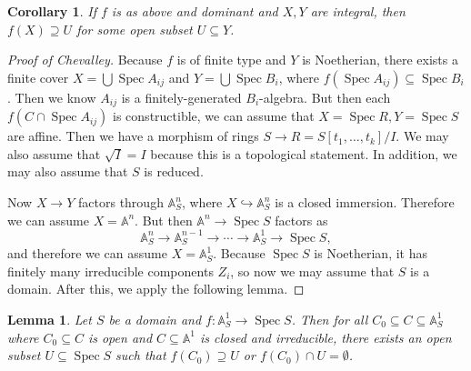 \documentclass[leqno, openany]{memoir}
\newtheorem{cor}[thm]{Corollary}
\newtheorem{lem}[thm]{Lemma}
\theoremstyle{definition}
\theoremstyle{remark}
\theoremstyle{plain}
\theoremstyle{definition}
\theoremstyle{remark}
\newcommand{\A}{\mathbb{A}}
\DeclareMathOperator{\Spec}{Spec}
\begin{document}
\begin{cor}
    If $f$ is as above and dominant and $X,Y$ are integral, then $f(X) \supseteq U$ for some open subset $U \subseteq Y$.
\end{cor}

\begin{proof}[Proof of Chevalley]
    Because $f$ is of finite type and $Y$ is Noetherian, there exists a finite cover $X = \bigcup \Spec A_{ij}$ and $Y = \bigcup \Spec B_i$, where $f(\Spec A_{ij}) \subseteq \Spec B_i$. Then we know $A_{ij}$ is a finitely-generated $B_i$-algebra. But then each $f(C \cap \Spec A_{ij})$ is constructible, we can assume that $X = \Spec R, Y = \Spec S$ are affine. Then we have a morphism of rings $S \to R = S[t_1, \ldots, t_k] / I$. We may also assume that $\sqrt{I} = I$ because this is a topological statement. In addition, we may also assume that $S$ is reduced.

    Now $X \to Y$ factors through $\A^n_S$, where $X \hookrightarrow \A^n_S$ is a closed immersion. Therefore we can assume $X = \A^n$. But then $\A^n \to \Spec S$ factors as 
    \[ \A^n_S \to \A^{n-1}_S \to \cdots \to \A^1_S \to \Spec S, \]
    and therefore we can assume $X = \A^1_S$. Because $\Spec S$ is Noetherian, it has finitely many irreducible components $Z_i$, so now we may assume that $S$ is a domain. After this, we apply the following lemma.
\end{proof}

\begin{lem}
    Let $S$ be a domain and $f \colon \A^1_S \to \Spec S$. Then for all $C_0 \subseteq C \subseteq \A^1_S$ where $C_0 \subseteq C$ is open and $C \subseteq \A^1$ is closed and irreducible, there exists an open subset $U \subseteq \Spec S$ such that $f(C_0) \supseteq U$ or $f(C_0) \cap U = \emptyset$.
\end{lem}
\end{document}
